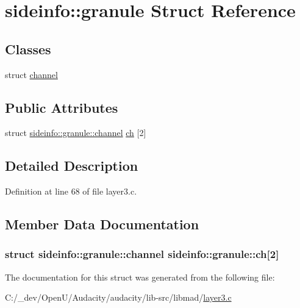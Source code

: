 \hypertarget{structsideinfo_1_1granule}{}\section{sideinfo\+:\+:granule Struct Reference}
\label{structsideinfo_1_1granule}
\subsection*{Classes}
\begin{DoxyCompactItemize}
\item 
struct \hyperlink{structsideinfo_1_1granule_1_1channel}{channel}
\end{DoxyCompactItemize}
\subsection*{Public Attributes}
\begin{DoxyCompactItemize}
\item 
struct \hyperlink{structsideinfo_1_1granule_1_1channel}{sideinfo\+::granule\+::channel} \hyperlink{structsideinfo_1_1granule_acc8525611f3c5fca3dcb103da1d99164}{ch} \mbox{[}2\mbox{]}
\end{DoxyCompactItemize}


\subsection{Detailed Description}


Definition at line 68 of file layer3.\+c.



\subsection{Member Data Documentation}
\subsubsection[{\texorpdfstring{ch}{ch}}]{\setlength{\rightskip}{0pt plus 5cm}struct {\bf sideinfo\+::granule\+::channel}  sideinfo\+::granule\+::ch\mbox{[}2\mbox{]}}\hypertarget{structsideinfo_1_1granule_acc8525611f3c5fca3dcb103da1d99164}{}\label{structsideinfo_1_1granule_acc8525611f3c5fca3dcb103da1d99164}


The documentation for this struct was generated from the following file\+:\begin{DoxyCompactItemize}
\item 
C\+:/\+\_\+dev/\+Open\+U/\+Audacity/audacity/lib-\/src/libmad/\hyperlink{layer3_8c}{layer3.\+c}\end{DoxyCompactItemize}
